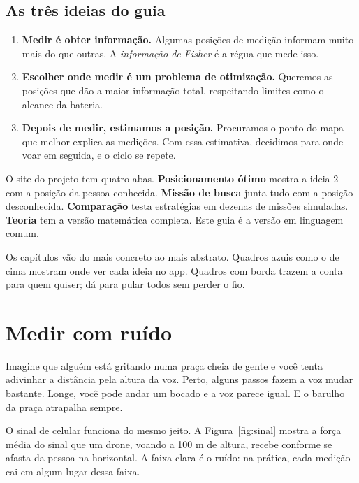 \documentclass[11pt,a4paper]{article}
\begin{document}
\subsection{As três ideias do guia}
\begin{enumerate}
  \item \textbf{Medir é obter informação.} Algumas posições de medição informam muito mais do que outras. A \emph{informação de Fisher} é a régua que mede isso.
  \item \textbf{Escolher onde medir é um problema de otimização.} Queremos as posições que dão a maior informação total, respeitando limites como o alcance da bateria.
  \item \textbf{Depois de medir, estimamos a posição.} Procuramos o ponto do mapa que melhor explica as medições. Com essa estimativa, decidimos para onde voar em seguida, e o ciclo se repete.
\end{enumerate}

\begin{noapp}
O site do projeto tem quatro abas. \textbf{Posicionamento ótimo} mostra a ideia 2 com a posição da pessoa conhecida. \textbf{Missão de busca} junta tudo com a posição desconhecida. \textbf{Comparação} testa estratégias em dezenas de missões simuladas. \textbf{Teoria} tem a versão matemática completa. Este guia é a versão em linguagem comum.
\end{noapp}

Os capítulos vão do mais concreto ao mais abstrato. Quadros azuis como o de cima mostram onde ver cada ideia no app. Quadros com borda trazem a conta para quem quiser; dá para pular todos sem perder o fio.

\section{Medir com ruído}

Imagine que alguém está gritando numa praça cheia de gente e você tenta adivinhar a distância pela altura da voz. Perto, alguns passos fazem a voz mudar bastante. Longe, você pode andar um bocado e a voz parece igual. E o barulho da praça atrapalha sempre.

O sinal de celular funciona do mesmo jeito. A Figura~\ref{fig:sinal} mostra a força média do sinal que um drone, voando a 100 m de altura, recebe conforme se afasta da pessoa na horizontal. A faixa clara é o ruído: na prática, cada medição cai em algum lugar dessa faixa.
\end{document}
